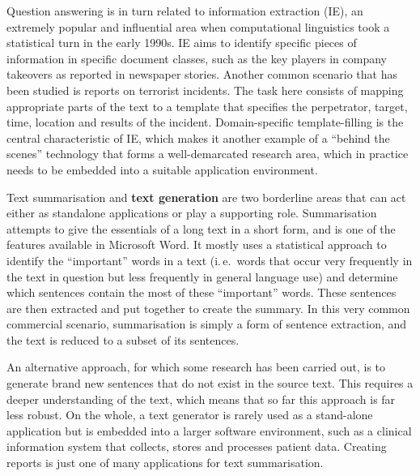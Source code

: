 \begin{multicols}{2}

Question answering is in turn related to information extraction (IE),
an extremely popular and influential area when computational
linguistics took a statistical turn in the early 1990s. IE aims to
identify specific pieces of information in specific document classes, such as the key players in company takeovers as reported in newspaper stories. Another common scenario that has been studied is reports on terrorist incidents. The task here consists of mapping appropriate parts of the text to a template that specifies the perpetrator, target, time, location and results of the incident. Domain-specific template-filling is the central characteristic of IE, which makes it another example of a “behind the scenes” technology that forms a well-demarcated research area, which in practice needs to be embedded into a suitable application environment. 

Text summarisation and \textbf{text generation} are two borderline areas that can act either as standalone applications or play a supporting role. Summarisation attempts to give the essentials of a long text in a short form, and is one of the features available in Microsoft Word. It mostly uses a statistical approach to identify the “important” words in a text (i.\,e.~words that occur very frequently in the text in question but less frequently in general language use) and determine which sentences contain the most of these “important” words. These sentences are then extracted and put together to create the summary. In this very common commercial scenario, summarisation is simply a form of sentence extraction, and the text is reduced to a subset of its sentences. 


An alternative approach, for which some research has been carried out, is to generate brand new sentences that do not exist in the source text. 
This requires a deeper understanding of the text, which means that so far this approach is far less robust. On the whole, a text generator is rarely used as a stand-alone application but is embedded into a larger software environment, such as a clinical information system that collects, stores and processes patient data. Creating reports is just one of many applications for text summarisation. 


\end{multicols}

